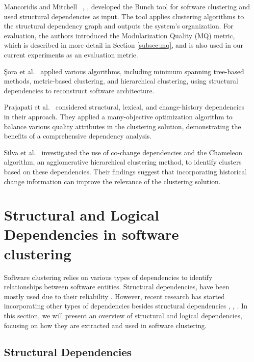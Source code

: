 \documentclass{ieeeaccess}
\begin{document}
 Mancoridis and Mitchell ~\cite{b10}, \cite{b101}, \cite{bunch} developed the Bunch tool for software clustering and used structural dependencies as input. The tool applies clustering algorithms to the structural dependency graph and outputs the system's organization. For evaluation, the authors introduced the Modularization Quality (MQ) metric, which is described in more detail in Section \ref{subsec:mq}, and is also used in our current experiments as an evaluation metric.

%
Şora et al.~\cite{b12} applied various algorithms, including minimum spanning tree-based methods, metric-based clustering, and hierarchical clustering, using structural dependencies to reconstruct software architecture.

Prajapati et al.~\cite{b18} considered structural, lexical, and change-history dependencies in their approach. They applied a many-objective optimization algorithm to balance various quality attributes in the clustering solution, demonstrating the benefits of a comprehensive dependency analysis.

Silva et al.~\cite{b16} investigated the use of co-change dependencies and the Chameleon algorithm, an agglomerative hierarchical clustering method, to identify clusters based on these dependencies. Their findings suggest that incorporating historical change information can improve the relevance of the clustering solution.



\section{Structural and Logical Dependencies in software clustering}
\label{sec:dependencies}

Software clustering relies on various types of dependencies to identify relationships between software entities. Structural dependencies, have been mostly used due to their reliability \cite{b12}. However, recent research has started incorporating other types of dependencies besides structural dependencies \cite{b13}, \cite{b14}, \cite{b18}.  In this section, we will present an overview of structural and logical dependencies, focusing on how they are extracted and used in software clustering.

\subsection{Structural Dependencies}
\end{document}
